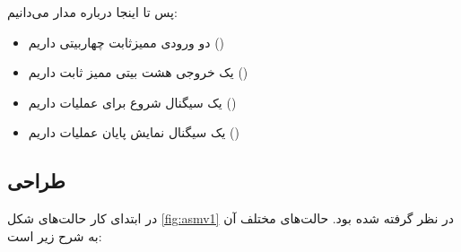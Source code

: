 \documentclass{article}
\begin{document}
پس تا اینجا درباره مدار می‌دانیم:
\begin{itemize}
\item دو ورودی ممیزثابت چهاربیتی داریم ()

\item یک خروجی هشت بیتی ممیز ثابت داریم ()

\item یک سیگنال شروع برای عملیات داریم ()

\item یک سیگنال نمایش پایان عملیات داریم ()
\end{itemize}

\subsection{طراحی }
در ابتدای کار حالت‌های شکل \ref{fig:asmv1} در نظر گرفته شده بود. حالت‌های مختلف آن به شرح زیر است:
\end{document}
